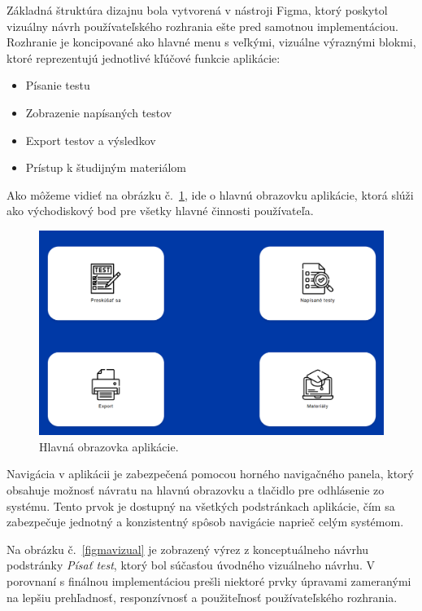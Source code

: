 Základná štruktúra dizajnu bola vytvorená v nástroji Figma, ktorý poskytol vizuálny návrh používateľského rozhrania ešte pred samotnou implementáciou. Rozhranie je koncipované ako hlavné menu s veľkými, vizuálne výraznými blokmi, ktoré reprezentujú jednotlivé kľúčové funkcie aplikácie:
\begin{itemize} 
  \item Písanie testu 
  \item Zobrazenie napísaných testov 
  \item Export testov a výsledkov 
  \item Prístup k študijným materiálom 
\end{itemize}

Ako môžeme vidieť na obrázku č.~\ref{homescreen}, ide o hlavnú obrazovku aplikácie, ktorá slúži ako východiskový bod pre všetky hlavné činnosti používateľa.

\begin{figure}[H]
  \centering
  \includegraphics[width=16cm]{img/homepage.png}
  \caption{Hlavná obrazovka aplikácie.}
  \label{homescreen}
\end{figure} 

Navigácia v aplikácii je zabezpečená pomocou horného navigačného panela, ktorý obsahuje možnosť návratu na hlavnú obrazovku a tlačidlo pre odhlásenie zo systému. Tento prvok je dostupný na všetkých podstránkach aplikácie, čím sa zabezpečuje jednotný a konzistentný spôsob navigácie naprieč celým systémom.

Na obrázku č.~\ref{figmavizual} je zobrazený výrez z konceptuálneho návrhu podstránky \textit{Písať test}, ktorý bol súčasťou úvodného vizuálneho návrhu. 
V porovnaní s finálnou implementáciou prešli niektoré prvky úpravami zameranými na lepšiu prehľadnosť, responzívnosť a použiteľnosť používateľského rozhrania.

